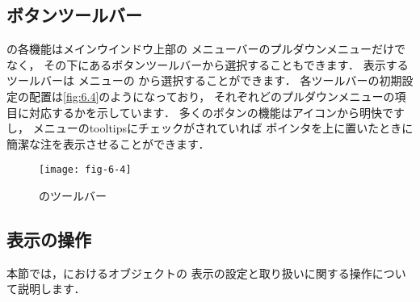 \subsection{ボタンツールバー}
\label{ssec:6.1.4}
の各機能はメインウインドウ上部の
メニューバーのプルダウンメニューだけでなく，
その下にあるボタンツールバーから選択することもできます．
表示するツールバーは
%
%
メニューの
%
%
から選択することができます．
各ツールバーの初期設定の配置は\autoref{fig:6.4}のようになっており，
それぞれどのプルダウンメニューの項目に対応するかを示しています．
多くのボタンの機能はアイコンから明快ですし，
%
%
メニューのtooltipsにチェックがされていれば
ポインタを上に置いたときに簡潔な注を表示させることができます．


\begin{figure}[ht]
 \texttt{[image: fig-6-4]}
 \caption{のツールバー}
 \label{fig:6.4}
\end{figure}


\subsection{表示の操作}
\label{ssec:6.1.5}
本節では，におけるオブジェクトの
表示の設定と取り扱いに関する操作について説明します．

